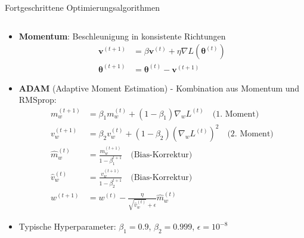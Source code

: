\documentclass[aspectratio=1610, xcolor=dvipsnames, 9pt]{beamer}
\begin{document}
      \begin{frame}{Fortgeschrittene Optimierungsalgorithmen}
        \begin{columns}
          \begin{column}{1\textwidth}
            \begin{itemize}
              \item \textbf{Momentum}: Beschleunigung in konsistente Richtungen
              \begin{align}
                \mathbf{v}^{(t+1)} &= \beta \mathbf{v}^{(t)} + \eta \nabla L(\boldsymbol{\theta}^{(t)}) \\
                \boldsymbol{\theta}^{(t+1)} &= \boldsymbol{\theta}^{(t)} - \mathbf{v}^{(t+1)}
              \end{align}
              \item \textbf{ADAM} \cite{kingma2014adam} (Adaptive Moment Estimation) - Kombination aus Momentum und RMSprop:
              \begin{align}
                m_w^{(t+1)} &= \beta_1 m_w^{(t)} + (1 - \beta_1) \nabla_w L^{(t)} \quad \text{(1. Moment)} \\
                v_w^{(t+1)} &= \beta_2 v_w^{(t)} + (1 - \beta_2) (\nabla_w L^{(t)})^2 \quad \text{(2. Moment)} \\
                \hat{m}_w^{(t)} &= \frac{m_w^{(t+1)}}{1 - \beta_1^{t+1}} \quad \text{(Bias-Korrektur)} \\
                \hat{v}_w^{(t)} &= \frac{v_w^{(t+1)}}{1 - \beta_2^{t+1}} \quad \text{(Bias-Korrektur)} \\
                w^{(t+1)} &= w^{(t)} - \frac{\eta}{\sqrt{\hat{v}_w^{(t)}} + \epsilon} \hat{m}_w^{(t)}
              \end{align}
              \item Typische Hyperparameter: $\beta_1 = 0.9$, $\beta_2 = 0.999$, $\epsilon = 10^{-8}$
            \end{itemize}
          \end{column}
        \end{columns}
      \end{frame}
\end{document}
